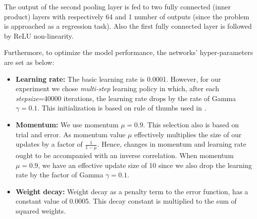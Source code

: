 \noindent The output of the second pooling layer is fed to two fully connected (inner product) layers with respectively 64 and 1 number of outputs (since the problem is approached as a regression task). Also the first fully connected layer is followed by ReLU non-linearity. 

Furthermore, to optimize the model performance, the networks' hyper-parameters are set as below:
\begin{itemize}
\item \textbf{Learning rate:} The basic learning rate is 0.0001. However, for our experiment we chose \textit{multi-step} learning policy in which, after each \textit{stepsize}=40000 iterations, the learning rate drops by the rate of Gamma $\gamma = 0.1$. This initialization is based on rule of thumbs used in \cite{krizhevsky2012imagenet}.
\item \textbf{Momentum:} We use momentum $\mu = 0.9$. This selection also is based on trial and error. As momentum value $\mu$ effectively multiplies the size of our updates by a factor of $\frac{1}{1-\mu}$. Hence, changes in momentum and learning rate ought to be accompanied with an inverse correlation. When momentum $\mu = 0.9$, we have an effective update size of 10 since we also drop the learning rate by the factor of Gamma $\gamma= 0.1$.
\item \textbf{Weight decay:} Weight decay as a penalty term to the error function, has a constant value of 0.0005. This decay constant is multiplied to the sum of squared weights.
\end{itemize}

